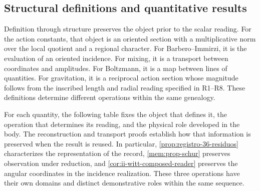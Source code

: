 \subsection{Structural definitions and quantitative results}
\label{sec:ii-conclusiones-cuantitativas}

Definition through structure preserves the object prior to the scalar
reading. For the action constants, that object is an oriented section
with a multiplicative norm over the local quotient and a regional character. For Barbero--Immirzi,
it is the evaluation of an oriented incidence. For mixing, it is a transport
between coordinates and amplitudes. For Boltzmann, it is a map between
lines of quantities. For gravitation, it is a reciprocal action section
whose magnitude follows from the inscribed length and radial reading
specified in R1--R8. These definitions
determine different operations within the same genealogy.

For each quantity, the following table fixes the object that defines it,
the operation that determines its reading, and the physical role developed
in the body. The reconstruction and transport proofs establish
how that information is preserved when the result is reused. In
particular, \ref{prop:registro-36-residuos} characterizes the representation
of the record, \ref{mem:prop-schur} preserves observation under reduction,
and \ref{cor:ii-witt-composed-reader} preserves the angular coordinates
in the incidence realization. These three operations have their own domains
and distinct demonstrative roles within the same sequence.

